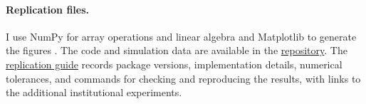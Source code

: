\paragraph{Replication files.}

I use NumPy for array operations and linear algebra \citep{harrisetal2020}
and Matplotlib to generate the figures \citep{hunter2007}.
The code and simulation data are available in the
\href{https://github.com/oliverpardo1979/ai-growth-and-labor}{repository}.
The \href{https://github.com/oliverpardo1979/ai-growth-and-labor/blob/main/REPLICATION.md}
{replication guide} records package versions, implementation details,
numerical tolerances, and commands for checking and reproducing the
results, with links to the additional institutional experiments.
